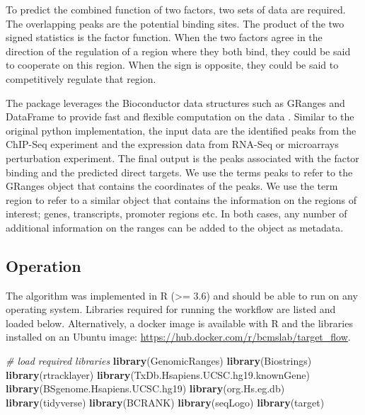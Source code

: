 \documentclass[9pt,a4paper,]{extarticle}
\newenvironment{Shaded}{\begin{snugshade}}{\end{snugshade}}
\newcommand{\CommentTok}[1]{\textcolor[rgb]{0.56,0.35,0.01}{\textit{#1}}}
\newcommand{\KeywordTok}[1]{\textcolor[rgb]{0.13,0.29,0.53}{\textbf{#1}}}
\newcommand{\NormalTok}[1]{#1}
\begin{document}
To predict the combined function of two factors, two sets of data are required. The overlapping peaks are the potential binding sites. The product of the two signed statistics is the factor function. When the two factors agree in the direction of the regulation of a region where they both bind, they could be said to cooperate on this region. When the sign is opposite, they could be said to competitively regulate that region.

The package leverages the Bioconductor data structures such as GRanges and DataFrame to provide fast and flexible computation on the data \citet{Huber2015}. Similar to the original python implementation, the input data are the identified peaks from the ChIP-Seq experiment and the expression data from RNA-Seq or microarrays perturbation experiment. The final output is the peaks associated with the factor binding and the predicted direct targets. We use the terms peaks to refer to the GRanges object that contains the coordinates of the peaks. We use the term region to refer to a similar object that contains the information on the regions of interest; genes, transcripts, promoter regions etc. In both cases, any number of additional information on the ranges can be added to the object as metadata.

\hypertarget{operation}{%
\subsection{Operation}\label{operation}}

The algorithm was implemented in R (\textgreater= 3.6) and should be able to run on any operating system. Libraries required for running the workflow are listed and loaded below. Alternatively, a docker image is available with R and the libraries installed on an Ubuntu image: \url{https://hub.docker.com/r/bcmslab/target_flow}.

\begin{Shaded}
\begin{Highlighting}[]
\CommentTok{# load required libraries}
\KeywordTok{library}\NormalTok{(GenomicRanges)}
\KeywordTok{library}\NormalTok{(Biostrings)}
\KeywordTok{library}\NormalTok{(rtracklayer)}
\KeywordTok{library}\NormalTok{(TxDb.Hsapiens.UCSC.hg19.knownGene)}
\KeywordTok{library}\NormalTok{(BSgenome.Hsapiens.UCSC.hg19)}
\KeywordTok{library}\NormalTok{(org.Hs.eg.db)}
\KeywordTok{library}\NormalTok{(tidyverse)}
\KeywordTok{library}\NormalTok{(BCRANK)}
\KeywordTok{library}\NormalTok{(seqLogo)}
\KeywordTok{library}\NormalTok{(target)}
\end{Highlighting}
\end{Shaded}
\end{document}
